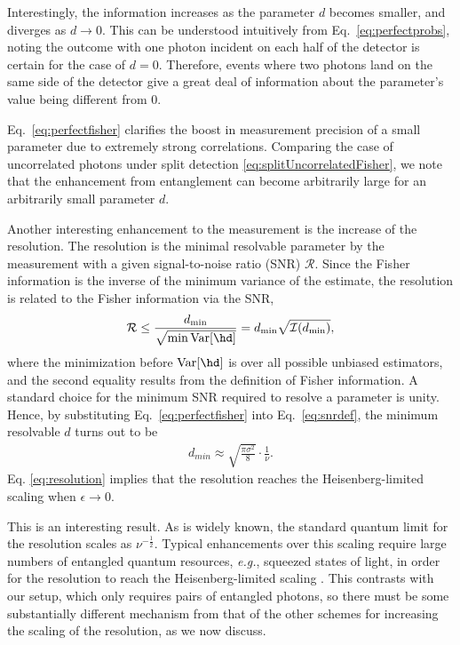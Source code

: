 Interestingly, the information increases as the parameter $d$ becomes smaller, and diverges as $d \rightarrow 0$.
This can be understood intuitively from Eq.~\eqref{eq:perfectprobs}, noting the outcome with one photon incident on each half of the detector is certain for the case of $d=0$.  
Therefore, events where two photons land on the same side of the detector give a great deal of information about the parameter's value being different from 0.

Eq.~\eqref{eq:perfectfisher} clarifies the boost in measurement precision of a small parameter due to extremely strong correlations.
Comparing the case of uncorrelated photons under split detection \eqref{eq:splitUncorrelatedFisher}, we note that the enhancement from entanglement can become arbitrarily large for an arbitrarily small parameter $d$. 

Another interesting enhancement to the measurement is the increase of the resolution. The resolution is the minimal resolvable parameter by the measurement with a given signal-to-noise ratio (SNR) $\mathcal{R}$. Since the Fisher information is the inverse of the minimum variance of the estimate, the resolution is related to the Fisher information via the SNR,
\begin{equation}\label{eq:snrdef}
\mathcal{R} \le \frac{d_{\min}}{\sqrt{\min\var{\hd}}}=d_{\min}\sqrt{\mi(d_{\min})},
\end{equation}
where the minimization before $\var{\hd}$ is over all possible unbiased estimators, and the second equality results from the definition of Fisher information.
A standard choice for the minimum SNR required to resolve a parameter is unity. Hence, by substituting Eq.~\eqref{eq:perfectfisher} into Eq.~\eqref{eq:snrdef}, the minimum resolvable $d$ turns out to be
\begin{align} \label{eq:resolution}
	d_{min} \approx \sqrt{\frac{\pi \sigma^2}{8}} \cdot \frac{1}{\nu}.
\end{align}
Eq. \eqref{eq:resolution} implies that the resolution reaches the Heisenberg-limited scaling when $\epsilon\rightarrow0$.

This is an interesting result. 
As is widely known, the standard quantum limit for the resolution scales as $\nu^{-\frac{1}{2}}$.
Typical enhancements over this scaling require large numbers of entangled quantum resources, \emph{e.g.}, squeezed states of light, in order for the resolution to reach the Heisenberg-limited scaling \cite{Barnett2003}. 
This contrasts with our setup, which only requires pairs of entangled photons, so there must be some substantially different mechanism from that of the other schemes for increasing the scaling of the resolution, as we now discuss.

